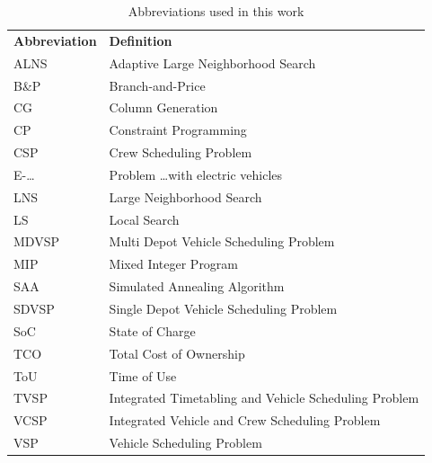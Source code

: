 \documentclass[]{article}
\begin{document}
\begin{table}
  \centering
  \begin{tabular}{ll}
    \toprule
    \multicolumn{1}{l}{\textbf{Abbreviation}} & \multicolumn{1}{l}{\textbf{Definition}}               \\
    \cmidrule(lr){1-1}\cmidrule(lr){2-2}
    ALNS                                      & Adaptive Large Neighborhood Search                    \\
    B\&P                                      & Branch-and-Price                                      \\
    CG                                        & Column Generation                                     \\
    CP                                        & Constraint Programming                                \\
    CSP                                       & Crew Scheduling Problem                               \\
    E-\dots                                   & Problem \dots with electric vehicles                  \\
    LNS                                       & Large Neighborhood Search                             \\
    LS                                        & Local Search                                          \\
    MDVSP                                     & Multi Depot Vehicle Scheduling Problem                \\
    MIP                                       & Mixed Integer Program                                 \\
    SAA                                       & Simulated Annealing Algorithm                         \\
    SDVSP                                     & Single Depot Vehicle Scheduling Problem               \\
    SoC                                       & State of Charge                                       \\
    TCO                                       & Total Cost of Ownership                               \\
    ToU                                       & Time of Use                                           \\
    TVSP                                      & Integrated Timetabling and Vehicle Scheduling Problem \\
    VCSP                                      & Integrated Vehicle and Crew Scheduling Problem        \\
    VSP                                       & Vehicle Scheduling Problem                            \\
    \bottomrule
  \end{tabular}
  \caption{Abbreviations used in this work}
  \label{tab:abbrev}
\end{table}
\end{document}

